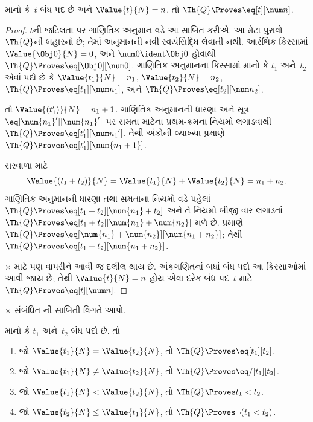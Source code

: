 \begin{lem}
માનો કે~$t$ બંધ પદ છે અને
$\Value{t}{N} = n$. તો
$\Th{Q} \Proves \eq[t][\num n]$.
\end{lem}

\begin{proof}
$t$ની જટિલતા પર ગાણિતિક અનુમાન
વડે આ સાબિત કરીએ. આ મેટા-પુરાવો $\Th{Q}$ની બહારનો છે;
તેમાં અનુમાનની નવી સ્વયંસિદ્ધિ લેવાતી નથી.
આરંભિક કિસ્સામાં
$\Value{\Obj 0}{N} = 0$,
અને $\num 0 \ident \Obj 0$
હોવાથી
$\Th{Q} \Proves \eq[\Obj 0][\num 0]$.
ગાણિતિક અનુમાનના કિસ્સામાં માનો કે
$t_1$ અને~$t_2$ એવાં પદો છે કે
$\Value{t_1}{N} = n_1$,
$\Value{t_2}{N} = n_2$,
$\Th{Q} \Proves \eq[t_1][\num n_1]$,
અને $\Th{Q} \Proves
\eq[t_2][\num n_2]$.

તો $\Value{(t_1')}{N} = n_1 + 1$.
ગાણિતિક અનુમાનની ધારણા અને
સૂત્ર~$\eq[\num{n_1}'][\num{n_1}']$
પર સમતા માટેના પ્રથમ-ક્રમના
નિયમો લગાડવાથી
$\Th{Q} \Proves
\eq[t_1'][{\num n_1}']$.
તેથી અંકોની વ્યાખ્યા પ્રમાણે
$\Th{Q} \Proves
\eq[t_1'][\num{n_1 + 1}]$.

સરવાળા માટે
\[
      \Value{(t_1 + t_2)}{N}
    = \Value{t_1}{N} + \Value{t_2}{N}
    = n_1 + n_2.
\]
ગાણિતિક અનુમાનની ધારણા તથા
સમતાના નિયમો વડે પહેલાં
$\Th{Q} \Proves
\eq[t_1 + t_2][\num{n_1} + t_2]$
અને તે નિયમો બીજી વાર
લગાડતાં
$\Th{Q} \Proves
\eq[t_1 + t_2][\num{n_1} + \num{n_2}]$
મળે છે.
પ્રમાણે
$\Th{Q} \Proves
\eq[\num{n_1} + \num{n_2}][\num{n_1 + n_2}]$;
તેથી $\Th{Q} \Proves
\eq[t_1 + t_2][\num{n_1 + n_2}]$.

$\times$ માટે પણ
વાપરીને આવી જ દલીલ થાય છે.
અંકગણિતનાં બધાં બંધ પદો
આ કિસ્સાઓમાં આવી જાય છે;
તેથી $\Value{t}{N} = n$
હોય એવા દરેક બંધ પદ~$t$
માટે $\Th{Q} \Proves
\eq[t][\num n]$.
\end{proof}
 
\begin{prob}
$\times$ સંબંધિત
ની
સાબિતી વિગતે આપો.
\end{prob}

\begin{lem}
માનો કે $t_1$ અને~$t_2$
બંધ પદો છે. તો
\begin{enumerate}
\item જો $\Value{t_1}{N} = \Value{t_2}{N}$,
    તો $\Th{Q} \Proves \eq[t_1][t_2]$.
\item જો $\Value{t_1}{N} \neq \Value{t_2}{N}$,
    તો $\Th{Q} \Proves \eq/[t_1][t_2]$.
\item જો $\Value{t_1}{N} < \Value{t_2}{N}$,
    તો $\Th{Q} \Proves t_1 < t_2$.
\item જો $\Value{t_2}{N} \leq \Value{t_1}{N}$,
    તો $\Th{Q} \Proves \lnot(t_1 < t_2)$.
\end{enumerate}
\end{lem}

